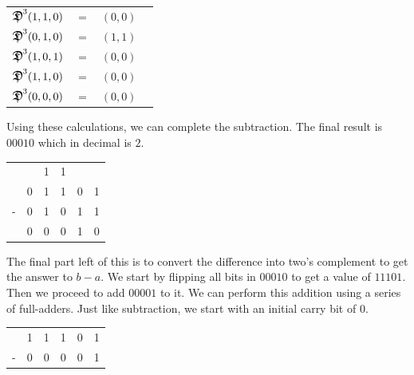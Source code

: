 \documentclass[oneside]{book}
\begin{document}
\begin{center}
\begin{tabular}{l c c c}
$\Sub^3(1,1,0)$ & $=$ & $(0,0)$ \\
$\Sub^3(0,1,0)$ & $=$ & $(1,1)$ \\
$\Sub^3(1,0,1)$ & $=$ & $(0,0)$ \\
$\Sub^3(1,1,0)$ & $=$ & $(0,0)$ \\
$\Sub^3(0,0,0)$ & $=$ & $(0,0)$
\end{tabular}
\end{center}
\tab
Using these calculations, we can complete the subtraction. The final result is $00010$ which in decimal is $2$.
\begin{center}
\begin{tabular}{c c c c c c}
  &    & 1 & 1 &  &  \\
  & 0 & 1 & 1 & 0 & 1 \\
- & 0 & 1 & 0 & 1 & 1 \\
\hline
  & 0 & 0 & 0 & 1 & 0
\end{tabular}
\end{center}
\tab
The final part left of this is to convert the difference into two's complement to get the answer to $b-a$. We start by flipping all bits in $00010$ to get a value of $11101$. Then we proceed to add $00001$ to it. We can perform this addition using a series of full-adders. Just like subtraction, we start with an initial carry bit of 0.
\begin{center}
\begin{tabular}{c c c c c c}
  & 1 & 1 & 1 & 0 & 1 \\
- & 0 & 0 & 0 & 0 & 1
\end{tabular}
\end{center}
\end{document}

